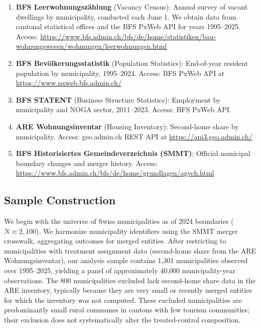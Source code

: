 \documentclass[12pt]{article}
\begin{document}
\begin{enumerate}
    \item \textbf{BFS Leerwohnungsz\"{a}hlung} (Vacancy Census): Annual survey of vacant dwellings by municipality, conducted each June 1. We obtain data from cantonal statistical offices and the BFS PxWeb API for years 1995--2025. Access: \url{https://www.bfs.admin.ch/bfs/de/home/statistiken/bau-wohnungswesen/wohnungen/leerwohnungen.html}

    \item \textbf{BFS Bev\"{o}lkerungsstatistik} (Population Statistics): End-of-year resident population by municipality, 1995--2024. Access: BFS PxWeb API at \url{https://www.pxweb.bfs.admin.ch/}

    \item \textbf{BFS STATENT} (Business Structure Statistics): Employment by municipality and NOGA sector, 2011--2023. Access: BFS PxWeb API.

    \item \textbf{ARE Wohnungsinventar} (Housing Inventory): Second-home share by municipality. Access: geo.admin.ch REST API at \url{https://api3.geo.admin.ch/}

    \item \textbf{BFS Historisiertes Gemeindeverzeichnis (SMMT)}: Official municipal boundary changes and merger history. Access: \url{https://www.bfs.admin.ch/bfs/de/home/grundlagen/agvch.html}
\end{enumerate}

\subsection{Sample Construction}

We begin with the universe of Swiss municipalities as of 2024 boundaries ($N \approx 2{,}100$). We harmonize municipality identifiers using the SMMT merger crosswalk, aggregating outcomes for merged entities. After restricting to municipalities with treatment assignment data (second-home share from the ARE Wohnungsinventar), our analysis sample contains 1{,}301 municipalities observed over 1995--2025, yielding a panel of approximately 40{,}000 municipality-year observations. The 800 municipalities excluded lack second-home share data in the ARE inventory, typically because they are very small or recently merged entities for which the inventory was not computed. These excluded municipalities are predominantly small rural communes in cantons with few tourism communities; their exclusion does not systematically alter the treated-control composition.
\end{document}
